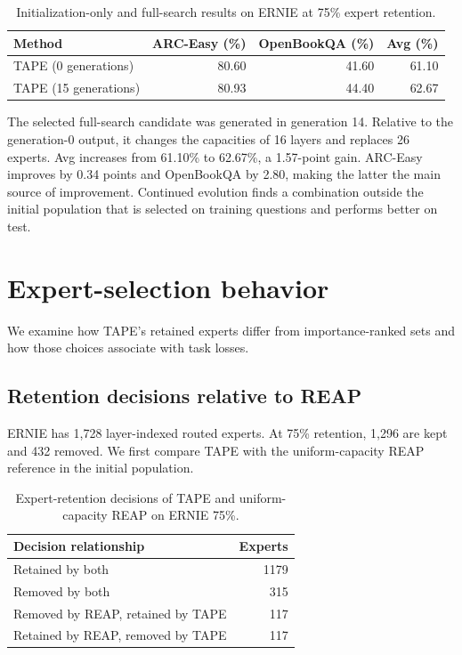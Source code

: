 \documentclass{article}
\begin{document}
\begin{table}[htbp]
\centering\small
\caption{Initialization-only and full-search results on ERNIE at 75\% expert retention.}
\label{tab:evolution}
\begin{tabularx}{\linewidth}{@{}Xrrr@{}}
\toprule
Method & ARC-Easy (\%) & OpenBookQA (\%) & Avg (\%) \\
\midrule
TAPE (0 generations) & 80.60 & 41.60 & 61.10 \\
TAPE (15 generations) & 80.93 & 44.40 & 62.67 \\
\bottomrule
\end{tabularx}
\end{table}

The selected full-search candidate was generated in generation 14. Relative to the generation-0 output, it changes the capacities of 16 layers and replaces 26 experts. Avg increases from 61.10\% to 62.67\%, a 1.57-point gain. ARC-Easy improves by 0.34 points and OpenBookQA by 2.80, making the latter the main source of improvement. Continued evolution finds a combination outside the initial population that is selected on training questions and performs better on test.

\section{Expert-selection behavior}
\label{sec:6}
We examine how TAPE's retained experts differ from importance-ranked sets and how those choices associate with task losses.

\subsection{Retention decisions relative to REAP}
\label{sec:6.1}
ERNIE has 1,728 layer-indexed routed experts. At 75\% retention, 1,296 are kept and 432 removed. We first compare TAPE with the uniform-capacity REAP reference in the initial population.

\begin{table}[htbp]
\centering\small
\caption{Expert-retention decisions of TAPE and uniform-capacity REAP on ERNIE 75\%.}
\label{tab:decisions}
\begin{tabularx}{\linewidth}{@{}Xr@{}}
\toprule
Decision relationship & Experts \\
\midrule
Retained by both & 1179 \\
Removed by both & 315 \\
Removed by REAP, retained by TAPE & 117 \\
Retained by REAP, removed by TAPE & 117 \\
\bottomrule
\end{tabularx}
\end{table}
\end{document}
